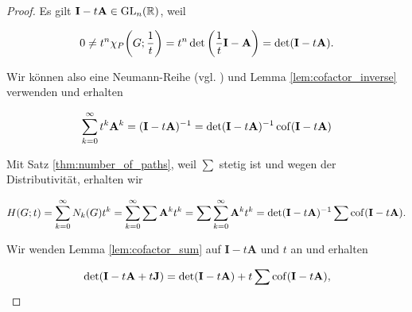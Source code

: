             \begin{proof}

                Es gilt $\mathbf I - t \mathbf A \in \operatorname{GL}_n(\mathbb R)$, weil

                \begin{align*}
                    0
                    \neq
                    t^n \chi_P {\left ( G; \frac{1}{t} \right )}
                    =
                    t^n \det {\left ( \frac{1}{t} \mathbf I - \mathbf A \right )}
                    =
                    \det(\mathbf I - t \mathbf A).
                \end{align*}

                Wir können also eine Neumann-Reihe (vgl. \cite[Kapitel 9.3]{Ana1&2}) und Lemma \ref{lem:cofactor_inverse} verwenden und erhalten

                \begin{align*}
                    \sum_{k=0}^\infty
                        t^k \mathbf A^k
                    =
                    (\mathbf I - t \mathbf A)^{-1}
                    =
                    \det(\mathbf I - t \mathbf A)^{-1} \operatorname{cof}(\mathbf I - t \mathbf A)
                \end{align*}

                Mit Satz \ref{thm:number_of_paths}, weil $\sum$ stetig ist und wegen der Distributivität, erhalten wir

                \begin{align} \label{eq:generating_function_eq_1}
                    H(G; t)
                    =
                    \sum_{k=0}^\infty
                        N_k(G) t^k
                    =
                    \sum_{k=0}^\infty
                        \sum \mathbf A^k
                            t^k
                    =
                    \sum
                        \sum_{k=0}^\infty
                            \mathbf A^k
                            t^k
                    =
                    \det(\mathbf I - t \mathbf A)^{-1} \sum \operatorname{cof}(\mathbf I - t \mathbf A).
                \end{align}

                Wir wenden Lemma \ref{lem:cofactor_sum} auf $\mathbf I - t \mathbf A$ und $t$ an und erhalten

                \begin{align*}
                    \det(\mathbf I - t \mathbf A + t \mathbf J)
                    =
                    \det(\mathbf I - t \mathbf A)
                    +
                    t \sum \operatorname{cof}(\mathbf I - t \mathbf A),
                \end{align*}


\end{proof}
